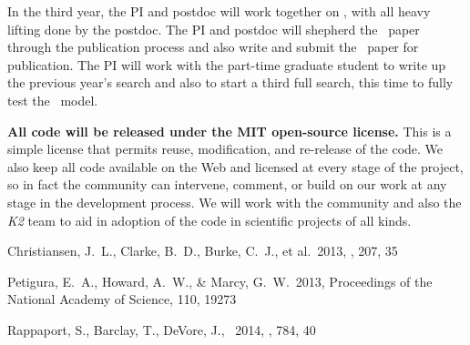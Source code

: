 \documentclass[letterpaper,12pt,preprint]{hack_aastex}
\begin{document}
In the third year, the PI and postdoc will work together on \kpsf, with all
heavy lifting done by the postdoc.
The PI and postdoc will shepherd the \PLM\ paper through the publication
process and also write and submit the \kpsf\ paper for publication.
The PI will work with the part-time graduate student to write up the previous
year's search and also to start a third full search, this time to
fully test the \kpsf\ model.

\textbf{All code will be released under the MIT open-source license.}
This is a simple license that permits reuse, modification, and re-release of
the code.
We also keep all code available on the Web and licensed at every stage of
the project, so in fact the community can intervene, comment, or build on our
work at any stage in the development process.
We will work with the community and also the \textsl{K2} team to aid in
adoption of the code in scientific projects of all kinds.

\clearpage
\begin{thebibliography}{}\raggedright%

Christiansen, J.~L., Clarke, B.~D., Burke, C.~J., et al.\ 2013, \apjs, 207, 35

Petigura, E.~A., Howard, A.~W., \& Marcy, G.~W.\ 2013,
Proceedings of the National Academy of Science, 110, 19273

Rappaport, S., Barclay, T., DeVore, J., \etal\ 2014, \apj, 784, 40

\end{thebibliography}
\end{document}
